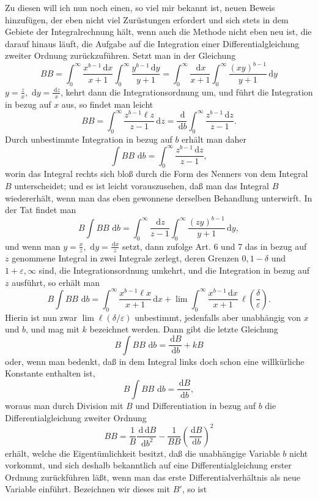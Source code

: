 \documentclass[11pt]{article}
\newcommand{\dd}{\,\mathrm d}
\begin{document}
Zu diesen will ich nun noch einen, so viel mir bekannt ist, neuen Beweis hinzufügen, der eben nicht viel Zurüstungen erfordert und sich stets in dem Gebiete der Integralrechnung hält, wenn auch die Methode nicht eben neu ist, die darauf hinaus läuft, die Aufgabe auf die Integration einer Differentialgleichung zweiter Ordnung zurückzuführen. Setzt man in der Gleichung
\[
B B=\int_0^\infty\frac{x^{b-1}\dd x}{x+1}
     \int_0^\infty\frac{y^{b-1}\dd y}{y+1}
=\int_0^\infty\frac{\dd x}{x+1}
     \int_0^\infty\frac{(xy)^{b-1}}{y+1}\dd y
\]
$y=\frac zx$, $\dd y=\frac{\dd z}{x}$, kehrt dann die Integrationsordnung um, und führt die Integration in bezug auf $x$ aus, so findet man leicht
\begin{equation}
B B=\int_0^\infty\frac{z^{b-1}\ell z}{z-1}\dd z
=\frac{\dd}{\dd b}\int_0^\infty\frac{z^{b-1}\dd z}{z-1}.
\tag{27}
\end{equation}
Durch unbestimmte Integration in bezug auf $b$ erhält man daher
\[
\int B B\,\dd b=\int_0^\infty\frac{z^{b-1}\dd z}{z-1},
\]
worin das Integral rechts sich bloß durch die Form des Nenners von dem Integral $B$ unterscheidet; und es ist leicht vorauszusehen, daß man das Integral $B$ wiedererhält, wenn man das eben gewonnene derselben Behandlung unterwirft. In der Tat findet man
\[
B\int B B\,\dd b
=\int_0^\infty\frac{\dd z}{z-1}
  \int_0^\infty\frac{(zy)^{b-1}}{y+1}\dd y,
\]
und wenn man $y=\frac xz$, $\dd y=\frac{\dd x}{z}$ setzt, dann zufolge Art. 6 und 7 das in bezug auf $z$ genommene Integral in zwei Integrale zerlegt, deren Grenzen $0,1-\delta$ und $1+\varepsilon,\infty$ sind, die Integrationsordnung umkehrt, und die Integration in bezug auf $z$ ausführt, so erhält man
\[
B\int B B\,\dd b
=\int_0^\infty\frac{x^{b-1}\ell x}{x+1}\dd x
+\lim\int_0^\infty\frac{x^{b-1}\dd x}{x+1}\,\ell\!\left(\frac{\delta}{\varepsilon}\right).
\]
Hierin ist nun zwar $\lim \ell(\delta/\varepsilon)$ unbestimmt, jedenfalls aber unabhängig von $x$ und $b$, und mag mit $k$ bezeichnet werden. Dann gibt die letzte Gleichung
\[
B\int B B\,\dd b=\frac{\dd B}{\dd b}+kB
\]
oder, wenn man bedenkt, daß in dem Integral links doch schon eine willkürliche Konstante enthalten ist,
\begin{equation}
B\int B B\,\dd b=\frac{\dd B}{\dd b},
\tag{28}
\end{equation}
woraus man durch Division mit $B$ und Differentiation in bezug auf $b$ die Differentialgleichung zweiter Ordnung
\[
B B=\frac1B\frac{\dd\dd B}{\dd b^2}
-\frac1{B B}\left(\frac{\dd B}{\dd b}\right)^2
\]
erhält, welche die Eigentümlichkeit besitzt, daß die unabhängige Variable $b$ nicht vorkommt, und sich deshalb bekanntlich auf eine Differentialgleichung erster Ordnung zurückführen läßt, wenn man das erste Differentialverhältnis als neue Variable einführt. Bezeichnen wir dieses mit $B'$, so ist
\end{document}
